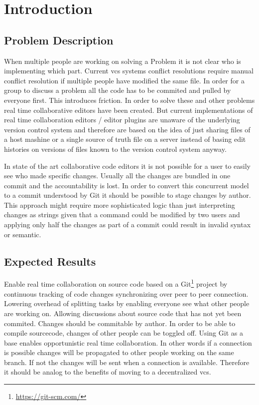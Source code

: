 \chapter{Introduction}
\label{sec:introduction}

\section{Problem Description}

When multiple people are working on solving a Problem it is not clear who is implementing which part. Current vcs systems conflict resolutions require manual conflict resolution if multiple people have modified the same file.
In order for a group to discuss a problem all the code has to be commited and pulled by everyone first. This introduces friction. In order to solve these and other problems real time collaborative editors have been created.
But current implementations of real time collaboration editors / editor plugins are unaware of the underlying version control system and therefore are based on the idea of just sharing files of a host mashine or a single source of truth file on a server instead of basing edit histories on versions of files known to the version control system anyway.

In state of the art collaborative code editors it is not possible for a user to easily see who made specific changes. Usually all the changes are bundled in one commit and the accountability is lost. In order to convert this concurrent model to a commit understood by Git it should be possible to stage changes by author. This approach might require more sophisticated logic than just interpreting changes as strings given that a command could be modified by two users and applying only half the changes as part of a commit could result in invalid syntax or semantic.

\section{Expected Results}

Enable real time collaboration on source code based on a Git\footnote{\href{https://git-scm.com/}{https://git-scm.com/}} project by
continuous tracking of code changes synchronizing over peer to peer connection.
Lowering overhead of splitting tasks by enabling everyone see what other people are working on. Allowing discussions about source code that has not yet been commited.
Changes should be commitable by author. In order to be able to compile sourcecode, changes of other people can be toggled off.
Using Git as a base enables opportunistic real time collaboration. In other words if a connection is possible changes will be propagated  to other people working on the same branch. If not the changes will be sent when a connection is available. \cite{AlwisSillito:2009:centralToDecentralVCS} Therefore it should be analog to the benefits of moving to a decentralized vcs.

